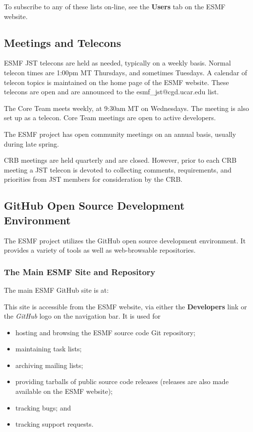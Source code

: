 To subscribe to any of these lists on-line, see the {\bf Users} 
tab on the ESMF website.

\subsection{Meetings and Telecons}

ESMF JST telecons are held as needed, typically on a weekly basis.
Normal telecon times are 1:00pm MT Thursdays, and sometimes Tuesdays.
A calendar of telecon topics is maintained on the home page of 
the ESMF website.  These telecons are open and are announced to 
the esmf\_jst@cgd.ucar.edu list.

The Core Team meets weekly, at 9:30am MT on Wednesdays.  The
meeting is also set up as a telecon.  Core Team meetings are open
to active developers.

The ESMF project has open community meetings on an annual basis,
usually during late spring.  

CRB meetings are held quarterly and are closed.  However, prior 
to each CRB meeting a JST telecon is devoted to collecting comments,
requirements, and priorities from JST members for consideration by
the CRB.  

\subsection{GitHub Open Source Development Environment}
The ESMF project utilizes the GitHub open source development
environment.  It provides a variety of tools as well as web-browsable
repositories.

\subsubsection{The Main ESMF Site and Repository}

The main ESMF GitHub site is at:
\begin{center}
\end{center}

This site is accessible from the ESMF website,
via either the {\bf Developers} link or the {\it GitHub}
logo on the navigation bar.  It is used for
\begin{itemize}
\item hosting and browsing the ESMF source code Git repository;
\item maintaining task lists;
\item archiving mailing lists;
\item providing tarballs of public source code releases (releases
      are also made available on the ESMF website);
\item tracking bugs; and 
\item tracking support requests.
\end{itemize}

